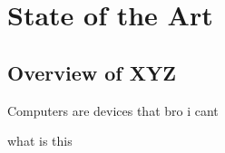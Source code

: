 \chapter{State of the Art}\label{chap:art}

\section{Overview of XYZ}
Computers are devices that
bro i cant

what is this